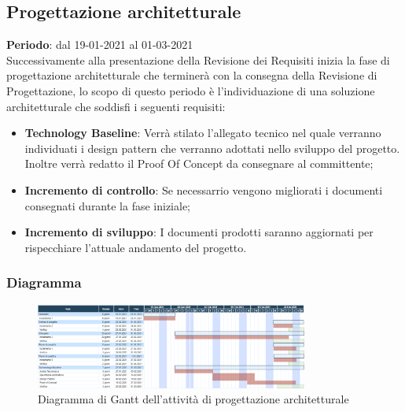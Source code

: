 	\subsection{Progettazione architetturale}
	\textbf{Periodo}: dal 19-01-2021 al 01-03-2021 \\
	Successivamente alla presentazione della Revisione dei Requisiti inizia la fase di progettazione architetturale che terminerà con la consegna della Revisione di Progettazione, lo scopo di questo periodo è l'individuazione di una soluzione architetturale che soddisfi i seguenti requisiti:
	\begin{itemize}
		\item \textbf{Technology Baseline}: Verrà stilato l'allegato tecnico nel quale verranno individuati i design pattern che verranno adottati nello sviluppo del progetto. Inoltre verrà redatto il Proof Of Concept da consegnare al committente;
		\item \textbf{Incremento di controllo}: Se necessarrio vengono migliorati i documenti consegnati durante la fase iniziale;
		\item \textbf{Incremento di sviluppo}: I documenti prodotti saranno aggiornati per rispecchiare l'attuale andamento del progetto.
	\end{itemize}
	
	\subsubsection{Diagramma}
		\begin{figure}[H]
        		\centering
        		\includegraphics[width=0.8\textwidth]{source/img/Progettazione_architetturale.png}
        		\caption{Diagramma di Gantt dell'attività di progettazione architetturale}
    		\end{figure}
